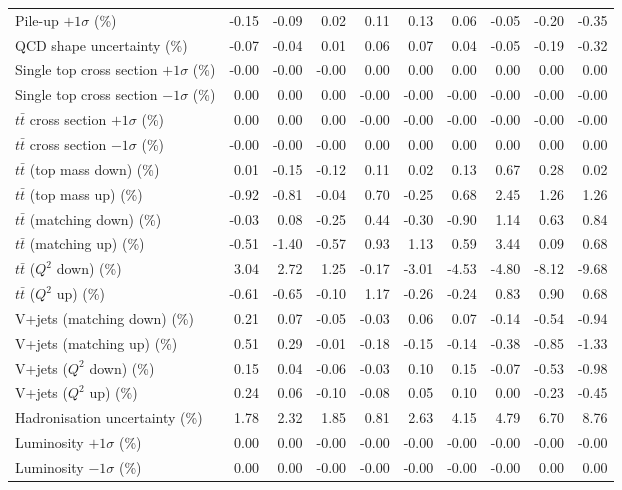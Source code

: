 \begin{table}[htbp]
{\begin{tabular}{lrrrrrrrrr}
Pile-up $+1\sigma$ (\%) & -0.15 & -0.09 & 0.02 & 0.11 & 0.13 & 0.06 & -0.05 & -0.20 & -0.35 \\ 
QCD shape uncertainty (\%) & -0.07 & -0.04 & 0.01 & 0.06 & 0.07 & 0.04 & -0.05 & -0.19 & -0.32 \\ 
Single top cross section $+1\sigma$ (\%) & -0.00 & -0.00 & -0.00 & 0.00 & 0.00 & 0.00 & 0.00 & 0.00 & 0.00 \\ 
Single top cross section $-1\sigma$ (\%) & 0.00 & 0.00 & 0.00 & -0.00 & -0.00 & -0.00 & -0.00 & -0.00 & -0.00 \\ 
$t\bar{t}$ cross section $+1\sigma$ (\%) & 0.00 & 0.00 & 0.00 & -0.00 & -0.00 & -0.00 & -0.00 & -0.00 & -0.00 \\ 
$t\bar{t}$ cross section $-1\sigma$ (\%) & -0.00 & -0.00 & -0.00 & 0.00 & 0.00 & 0.00 & 0.00 & 0.00 & 0.00 \\ 
$t\bar{t}$ (top mass down) (\%) & 0.01 & -0.15 & -0.12 & 0.11 & 0.02 & 0.13 & 0.67 & 0.28 & 0.02 \\ 
$t\bar{t}$ (top mass up) (\%) & -0.92 & -0.81 & -0.04 & 0.70 & -0.25 & 0.68 & 2.45 & 1.26 & 1.26 \\ 
$t\bar{t}$ (matching down) (\%) & -0.03 & 0.08 & -0.25 & 0.44 & -0.30 & -0.90 & 1.14 & 0.63 & 0.84 \\ 
$t\bar{t}$ (matching up) (\%) & -0.51 & -1.40 & -0.57 & 0.93 & 1.13 & 0.59 & 3.44 & 0.09 & 0.68 \\ 
$t\bar{t}$ ($Q^{2}$ down) (\%) & 3.04 & 2.72 & 1.25 & -0.17 & -3.01 & -4.53 & -4.80 & -8.12 & -9.68 \\ 
$t\bar{t}$ ($Q^{2}$ up) (\%) & -0.61 & -0.65 & -0.10 & 1.17 & -0.26 & -0.24 & 0.83 & 0.90 & 0.68 \\ 
V+jets (matching down) (\%) & 0.21 & 0.07 & -0.05 & -0.03 & 0.06 & 0.07 & -0.14 & -0.54 & -0.94 \\ 
V+jets (matching up) (\%) & 0.51 & 0.29 & -0.01 & -0.18 & -0.15 & -0.14 & -0.38 & -0.85 & -1.33 \\ 
V+jets ($Q^{2}$ down) (\%) & 0.15 & 0.04 & -0.06 & -0.03 & 0.10 & 0.15 & -0.07 & -0.53 & -0.98 \\ 
V+jets ($Q^{2}$ up) (\%) & 0.24 & 0.06 & -0.10 & -0.08 & 0.05 & 0.10 & 0.00 & -0.23 & -0.45 \\ 
Hadronisation uncertainty (\%) & 1.78 & 2.32 & 1.85 & 0.81 & 2.63 & 4.15 & 4.79 & 6.70 & 8.76 \\ 
Luminosity $+1\sigma$ (\%) & 0.00 & 0.00 & -0.00 & -0.00 & -0.00 & -0.00 & -0.00 & -0.00 & -0.00 \\ 
Luminosity $-1\sigma$ (\%) & 0.00 & 0.00 & -0.00 & -0.00 & -0.00 & -0.00 & -0.00 & 0.00 & 0.00 \\ 

\end{tabular}}
\end{table}
